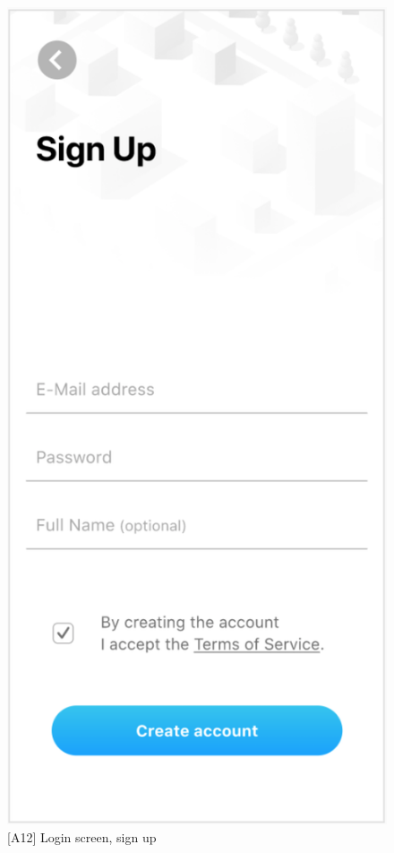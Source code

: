\begin{figure}
\begin{minipage}{.45\textwidth}
        \includegraphics[width=.7\linewidth]{assets/user_interface_design/login/login_screen_sign_up.png}
        \caption{[A12] Login screen, sign up}
        \label{fig:login_screen_sign_up}
    \end{minipage}
    \label{fig:login_screen_all}
\end{figure}
